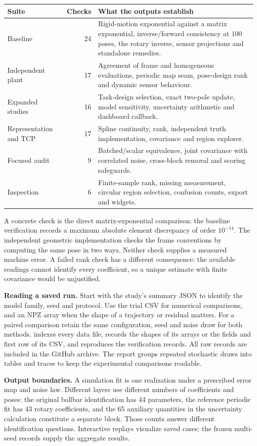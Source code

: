 \begin{center}\small\begin{tabular}{@{}p{29mm}rp{99mm}@{}}\toprule
Suite & Checks & What the outputs establish\\\midrule
Baseline & 24 & Rigid-motion exponential against a matrix exponential, inverse/forward consistency at 100 poses, the rotary inverse, sensor projections and standalone remedies.\\
Independent plant & 17 & Agreement of frame and homogeneous evaluations, periodic map seam, pose-design rank and dynamic sensor behaviour.\\
Expanded studies & 16 & Task-design selection, exact two-pole update, model sensitivity, uncertainty arithmetic and dashboard callback.\\
Representation and TCP & 17 & Spline continuity, rank, independent truth implementation, covariance and region explorer.\\
Focused audit & 9 & Batched/scalar equivalence, joint covariance with correlated noise, cross-block removal and scoring safeguards.\\
Inspection & 6 & Finite-sample rank, missing measurement, circular region selection, confusion counts, export and widgets.\\\bottomrule
\end{tabular}\end{center}
A concrete check is the direct matrix-exponential comparison: the baseline verification records a maximum absolute element discrepancy of order $10^{-14}$. The independent geometric implementation checks the frame conventions by computing the same pose in two ways. Neither check supplies a measured machine error. A failed rank check has a different consequence: the available readings cannot identify every coefficient, so a unique estimate with finite covariance would be unjustified.

\textbf{Reading a saved run.} Start with the study's summary JSON to identify the model family, seed and protocol. Use the trial CSV for numerical comparisons, and an NPZ array when the shape of a trajectory or residual matters. For a paired comparison retain the same configuration, seed and noise draw for both methods.  indexes every data file, records the shapes of its arrays or the fields and first row of its CSV, and reproduces the verification records. All raw records are included in the GitHub archive. The report groups repeated stochastic draws into tables and traces to keep the experimental comparisons readable.

\textbf{Output boundaries.} A simulation fit is one realization under a prescribed error map and noise law. Different layers use different numbers of coefficients and poses: the original ballbar identification has 44 parameters, the reference periodic fit has 43 rotary coefficients, and the 65 auxiliary quantities in the uncertainty calculation constitute a separate block. Those counts answer different identification questions. Interactive replays visualize saved cases; the frozen multi-seed records supply the aggregate results.
